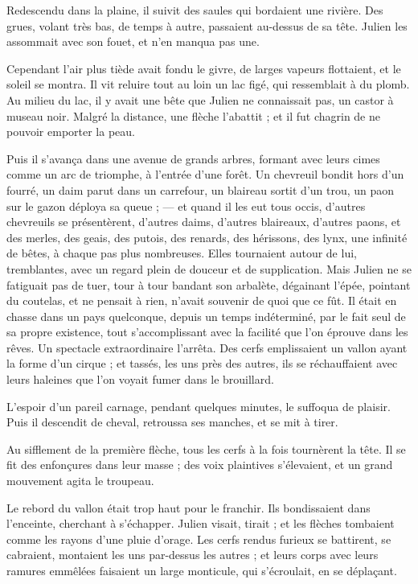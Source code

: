 \documentclass[]{book}
\begin{document}
                Redescendu dans la plaine, il suivit des saules qui bordaient une rivière. Des grues, volant très bas, de temps à autre, passaient au-dessus de sa tête. Julien les assommait avec son fouet, et n'en manqua pas une.
                    
                Cependant l'air plus tiède avait fondu le givre, de larges vapeurs flottaient, et le soleil se montra. Il vit reluire tout au loin un lac figé, qui ressemblait à du plomb. Au milieu du lac, il y avait une bête que Julien ne connaissait pas, un castor à museau noir. Malgré la distance, une flèche l'abattit ; et il fut chagrin de ne pouvoir emporter la peau.
                    
                Puis il s'avança dans une avenue de grands arbres, formant avec leurs cimes comme un arc de triomphe, à l'entrée d'une forêt. Un chevreuil bondit hors d'un fourré, un daim parut dans un carrefour, un blaireau sortit d'un trou, un paon sur le gazon déploya sa queue ; — et quand il les eut tous occis, d'autres chevreuils se présentèrent, d'autres daims, d'autres blaireaux, d'autres paons, et des merles, des geais, des putois, des renards, des hérissons, des lynx, une infinité de bêtes, à chaque pas plus nombreuses. Elles tournaient autour de lui, tremblantes, avec un regard plein de douceur et de supplication. Mais Julien ne se fatiguait pas de tuer, tour à tour bandant son arbalète, dégainant l'épée, pointant du coutelas, et ne pensait à rien, n'avait souvenir de quoi que ce fût. Il était en chasse dans un pays quelconque, depuis un temps indéterminé, par le fait seul de sa propre existence, tout s'accomplissant avec la facilité que l'on éprouve dans les rêves. Un spectacle extraordinaire l'arrêta. Des cerfs emplissaient un vallon ayant la forme d'un cirque ; et tassés, les uns près des autres, ils se réchauffaient avec leurs haleines que l'on voyait fumer dans le brouillard.
                    
                L'espoir d'un pareil carnage, pendant quelques minutes, le suffoqua de plaisir. Puis il descendit de cheval, retroussa ses manches, et se mit à tirer.
                    
                Au sifflement de la première flèche, tous les cerfs à la fois tournèrent la tête. Il se fit des enfonçures dans leur masse ; des voix plaintives s'élevaient, et un grand mouvement agita le troupeau.
                    
                Le rebord du vallon était trop haut pour le franchir. Ils bondissaient dans l'enceinte, cherchant à s'échapper. Julien visait, tirait ; et les flèches tombaient comme les rayons d'une pluie d'orage. Les cerfs rendus furieux se battirent, se cabraient, montaient les uns par-dessus les autres ; et leurs corps avec leurs ramures emmêlées faisaient un large monticule, qui s'écroulait, en se déplaçant.
                    
\end{document}

